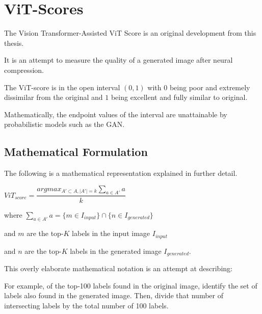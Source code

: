 \section{ViT-Scores}

The Vision Transformer-Assisted ViT Score is an original development from this thesis. 

It is an attempt to measure the quality of a generated image after neural compression.

The ViT-score is in the open interval $(0,1)$ with $0$ being poor and extremely dissimilar from
the original and $1$ being excellent and fully similar to original.

Mathematically, the endpoint values of the interval are unattainable by probabilistic models
such as the GAN.

\subsection{Mathematical Formulation}

The following is a mathematical representation explained in further detail.

\begin{center}
    $ViT_{score} = \displaystyle\dfrac{argmax_{A'\subset A,\lvert A' \rvert = k } \sum_{a \in A'} {a} }{k} $
\end{center}

\vspace{1mm}

\begin{center}
where $\sum_{a \in A'} {a}  = \lbrace{m \in I_{input}}\rbrace \cap \lbrace{n \in I_{generated}}\rbrace$
\end{center}

\vspace{2mm}

and $m$ are the top-$K$ labels in the input image $I_{input}$

and $n$ are the top-$K$ labels in the generated image $I_{generated}$.

\vspace{4pt}

This overly elaborate mathematical notation is an attempt at describing:




For example, of the top-100 labels found in the original image, 
identify the set of labels also found in the generated image. 
Then, divide that number of intersecting
labels by the total number of 100 labels.


